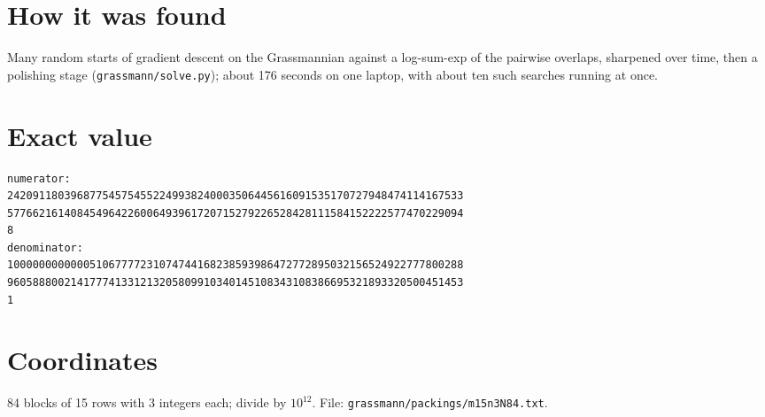 \documentclass[11pt,a4paper]{article}
\begin{document}
\section{How it was found}
Many random starts of gradient descent on the Grassmannian against a log-sum-exp of the pairwise overlaps, sharpened over time, then a polishing stage (\texttt{grassmann/solve.py}); about 176 seconds on one laptop, with about ten such searches running at once.


\appendix
\section{Exact value}
{\small
\begin{verbatim}
numerator:
242091180396877545754552249938240003506445616091535170727948474114167533
577662161408454964226006493961720715279226528428111584152222577470229094
8
denominator:
100000000000051067777231074744168238593986472772895032156524922777800288
960588800214177741331213205809910340145108343108386695321893320500451453
1
\end{verbatim}}

\section{Coordinates}
84 blocks of 15 rows with 3 integers each; divide by $10^{12}$. File: \texttt{grassmann/packings/m15n3N84.txt}.
{\tiny
\begin{multicols}{3}
\end{multicols}}
\end{document}
